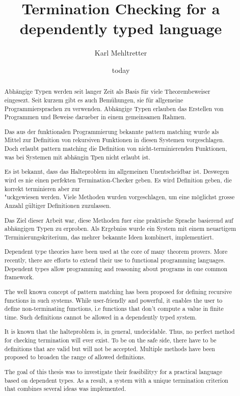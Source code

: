 \documentclass[a4paper,11pt]{report}
\theoremstyle{remark}
\begin{document}
\title{Termination Checking for a dependently typed language}
\author{Karl Mehltretter}
\date{today}
\renewcommand{\abstractname}{Abstrakt}
\begin{abstract}
Abh\"angige Typen werden seit langer Zeit als Basis f\"ur viele Theorembeweiser eingesezt.
Seit kurzem gibt es auch Bem\"uhungen, sie f\"ur allgemeine Programmiersprachen zu verwenden.
Abh\"angige Typen erlauben das Erstellen von Programmen und Beweise darueber in einem gemeinsamen Rahmen.

Das aus der funktionalen Programmierung bekannte pattern matching wurde als Mittel zur Definition von
rekursiven Funktionen in diesen Systemen vorgeschlagen.
Doch erlaubt pattern matching die Definition von nicht-terminierenden Funktionen, was bei Systemen mit abh\"angin Tpen nicht erlaubt ist.

Es ist bekannt, dass das Halteproblem im allgemeinen Unentscheidbar ist. 
Deswegen wird es nie einen perfekten Termination-Checker geben. Es wird Definition geben, die korrekt terminieren aber zur\\"uckgewiesen werden.
Viele Methoden wurden vorgeschlagen, um eine m\"oglichst grosse Anzahl g\"ultiger Definitionen zuzulassen.

Das Ziel dieser Arbeit war, diese Methoden fuer eine praktische Sprache basierend auf abh\"angigen Typen zu erproben.
Als Ergebniss wurde ein System mit einem neuartigem Terminierungskriterium, das mehrer bekannte Ideen kombinert, implementiert.
\end{abstract}
\newpage

\renewcommand{\abstractname}{Abstract}
\begin{abstract}
Dependent type theories have been used at the core of many theorem provers.
More recently, there are efforts to extend their use to functional programming languages.
Dependent types allow programming and reasoning about programs in one common framework.

The well known concept of pattern matching has been proposed for defining recursive functions in such systems.
While user-friendly and powerful, it enables the user to define non-terminating functions, i.e functions that don't compute a value in finite time. Such definitions cannot be allowed in a dependently typed system. 

It is known that the halteproblem is, in general, undecidable. Thus, no perfect method for checking termination will ever exist. To be on the safe side, there have to be definitions that are valid but will not be accepted.
Multiple methods have been proposed to broaden the range of allowed definitions.

The goal of this thesis was to investigate their feasibilityy for a practical language based on dependent types.
As a result, a system with a unique termination criterion that combines several ideas was implemented.
\end{abstract}
\tableofcontents






\end{document}
